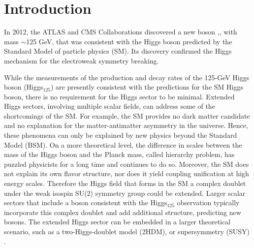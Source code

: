 \documentclass[a4paper, oneside, 11pt, openright]{book}
\begin{document}
	\clearpage\null\thispagestyle{empty}\newpage
	
	\tableofcontents
	
	\chapter*{Introduction}
	
		In 2012, the ATLAS and CMS Collaborations discovered a new boson \cite{higgs_atlas},\cite{higgs_cms}, with mass $\sim$125 GeV, that was consistent with the Higgs boson predicted by the Standard Model of particle physics (SM). Its discovery confirmed the Higgs mechanism for the electroweak symmetry breaking.
		
		While the measurements of the production and decay rates of the 125-GeV Higgs boson (Higgs$_{125}$) are presently consistent with the predictions for the SM Higgs boson, there is no requirement for the Higgs sector to be minimal. Extended Higgs sectors, involving multiple scalar fields, can address some of the shortcomings of the SM. For example, the SM provides no dark matter candidate and no explanation for the matter-antimatter asymmetry in the universe. Hence, these phenomena can only be explained by new physics beyond the Standard Model (BSM). On a more theoretical level, %
		the difference in scales between the mass of the Higgs boson and the Planck mass, called hierarchy problem, has puzzled physicists for a long time and continues to do so. Moreover, the SM does not explain its own flavor structure, nor does it yield coupling unification at high energy scales\cite{ext_higgs}. Therefore the Higgs field that forms in the SM a complex doublet under the weak isospin SU(2) symmetry group could be extended. Larger scalar sectors that include a boson consistent with the Higgs$_{125}$ observation typically incorporate this complex doublet and add additional structure, predicting new bosons. The extended Higgs sector can be embedded in a larger theoretical scenario, such as a two-Higgs-doublet model (2HDM)\cite{Branco_2012}, or supersymmetry (SUSY) \cite{dine_2016}.%
		
\end{document}
